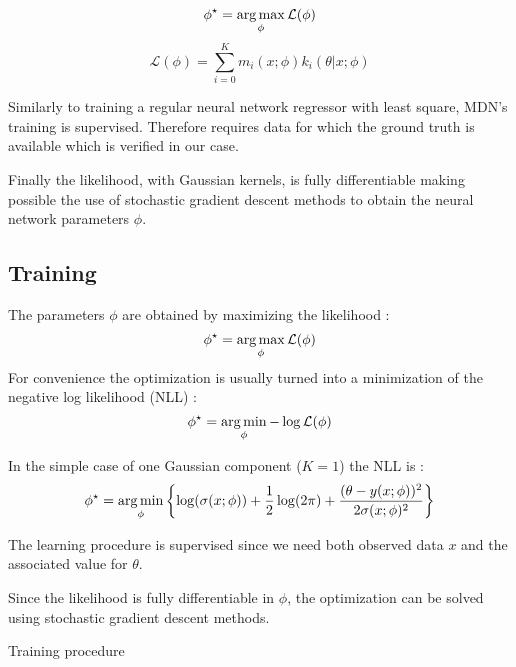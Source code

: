 \begin{equation}
    \phi^\star = \operatorname*{arg\,max}_\phi \mathcal L (\phi)
\end{equation}
\begin{equation}
    \mathcal L (\phi) = \sum_{i=0}^K m_i(x ; \phi) k_i(\theta | x ; \phi)
\end{equation}

Similarly to training a regular neural network regressor with least square, MDN's training is supervised.
Therefore requires data for which the ground truth is available which is verified in our case.

Finally the likelihood, with Gaussian kernels, is fully differentiable making possible the use of stochastic gradient descent methods to obtain the neural network parameters $\phi$.

\subsection{Training} %
\label{sub:training}


The parameters $\phi$ are obtained by maximizing the likelihood :
\begin{equation}
    \phi^\star = \operatorname*{arg\,max}_\phi \mathcal L (\phi)
\end{equation}
For convenience the optimization is usually turned into a minimization of the negative log likelihood (NLL) :
\begin{equation}
    \phi^\star = \operatorname*{arg\,min}_\phi - \log \mathcal L (\phi)
\end{equation}

In the simple case of one Gaussian component ($K=1$) the NLL is :
\begin{equation}
    \phi^\star = \operatorname*{arg\,min}_\phi \left\{ \log(\sigma(x;\phi)) + \frac{1}{2}\log(2\pi) + \frac{(\theta - y(x;\phi))^2}{2\sigma(x;\phi)^2} \right\}
\end{equation}

The learning procedure is supervised since we need both observed data $x$ and the associated value for  $\theta$.

Since the likelihood is fully differentiable in $\phi$, the optimization can be solved using stochastic gradient descent methods.

\begin{algorithm}[H]
 \caption{Training procedure}
\end{algorithm}

